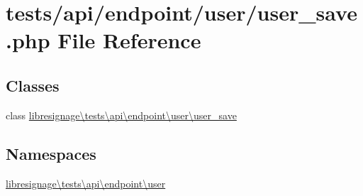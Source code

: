\hypertarget{tests_2api_2endpoint_2user_2user__save_8php}{}\section{tests/api/endpoint/user/user\+\_\+save.php File Reference}
\label{tests_2api_2endpoint_2user_2user__save_8php}
\subsection*{Classes}
\begin{DoxyCompactItemize}
\item 
class \hyperlink{classlibresignage_1_1tests_1_1api_1_1endpoint_1_1user_1_1user__save}{libresignage\textbackslash{}tests\textbackslash{}api\textbackslash{}endpoint\textbackslash{}user\textbackslash{}user\+\_\+save}
\end{DoxyCompactItemize}
\subsection*{Namespaces}
\begin{DoxyCompactItemize}
\item 
 \hyperlink{namespacelibresignage_1_1tests_1_1api_1_1endpoint_1_1user}{libresignage\textbackslash{}tests\textbackslash{}api\textbackslash{}endpoint\textbackslash{}user}
\end{DoxyCompactItemize}
